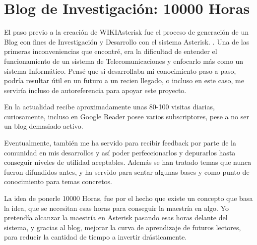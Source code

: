 
\section*{Blog de Investigación: 10000 Horas}

El paso previo a la creación de WIKIAsterisk fue el proceso de generación de un Blog con fines de Investigación y Desarrollo con el sistema Asterisk. \cite{website:10000horas}. Una de las primeras inconveniencias que encontré, era la dificultad de entender el funcionamiento de un sistema de Telecomunicaciones y enfocarlo más como un sistema Informático. Pensé que si desarrollaba mi conocimiento paso a paso, podría resultar útil en un futuro a un recien llegado, o incluso en este caso, me serviría incluso de autoreferencia para apoyar este proyecto.

En la actualidad recibe aproximadamente unas 80-100 visitas diarias, curiosamente, incluso en Google Reader posee varios subscriptores, pese a no ser un blog demasiado activo.

Eventualmente, también me ha servido para recibir feedback por parte de la comunidad en mis desarrollos y así poder perfeccionarlos y depurarlos hasta conseguir niveles de utilidad aceptables. Además se han tratado temas que nunca fueron difundidos antes, y ha servido para sentar algunas bases y como punto de conocimiento para temas concretos.

La idea de ponerle 10000 Horas, fue por el hecho que existe un concepto que basa la idea, que se necesitan esas horas para conseguir la maestría en algo. Yo pretendía alcanzar la maestría en Asterisk pasando esas horas delante del sistema, y gracias al blog, mejorar la curva de aprendizaje de futuros lectores, para reducir la cantidad de tiempo a invertir drásticamente.




